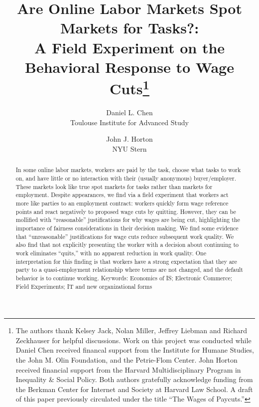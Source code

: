 \documentclass[11pt]{article}
\begin{document}
\title{Are Online Labor Markets Spot Markets for Tasks?:\\ A Field
  Experiment on the Behavioral Response to Wage Cuts\footnote{
The authors thank Kelsey Jack, Nolan Miller, Jeffrey Liebman and Richard Zeckhauser for helpful discussions.
Work on this project was conducted while Daniel Chen received financal support from the Institute for Humane Studies, the John M. Olin Foundation, and the Petrie-Flom Center.
John Horton received financial support from the Harvard Multidisciplinary Program in Inequality \& Social Policy.
Both authors gratefully acknowledge funding from the Berkman Center for Internet and Society at Harvard Law School. A draft of this paper previously circulated under the title ``The Wages of Paycuts.''
}} 

\author{Daniel L. Chen\\Toulouse Institute for Advanced Study \and John J. Horton\\NYU Stern}

\date{}
\maketitle{}

\begin{abstract} 
  \noindent
  In some online labor markets, workers are paid by the task, choose what tasks to work on, and have little or no interaction with their (usually anonymous) buyer/employer.  
  These markets look like true spot markets for tasks rather than markets for employment. 
  Despite appearances, we find via a field experiment that workers act more like parties to an employment contract:
  workers quickly form wage reference points and react negatively to proposed wage cuts by quitting.
  However, they can be mollified with ``reasonable'' justifications for why wages are being cut, highlighting the importance of fairness considerations in their decision making. 
  We find some evidence that ``unreasonable'' justifications for wage
  cuts reduce subsequent work quality. 
  We also find that not explicitly presenting the worker with a decision about continuing to work eliminates ``quits,'' with no apparent reduction in work quality.
  One interpretation for this finding is that workers have a strong expectation that they are party to a quasi-employment relationship where terms are not changed, and the default behavior is to continue working. 
  \newline \newline 
Keywords: Economics of IS; Electronic Commerce; Field Experiments; IT and new organizational forms
\end{abstract} 
\end{document}
